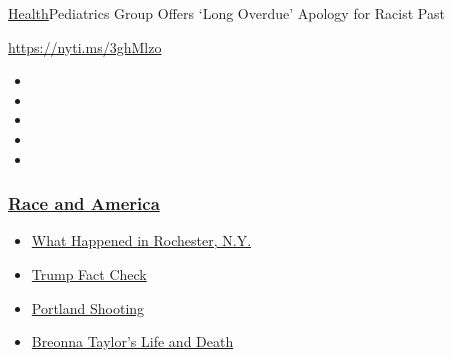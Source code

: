 \href{/section/health}{Health}\textbar{}Pediatrics Group Offers `Long
Overdue' Apology for Racist Past

\url{https://nyti.ms/3ghMlzo}

\begin{itemize}
\item
\item
\item
\item
\item
\end{itemize}

\hypertarget{race-and-america}{%
\subsubsection{\texorpdfstring{\href{https://www.nytimes3xbfgragh.onion/news-event/george-floyd-protests-minneapolis-new-york-los-angeles?name=styln-george-floyd\&region=TOP_BANNER\&block=storyline_menu_recirc\&action=click\&pgtype=Article\&impression_id=c7436050-f292-11ea-b36f-5d9f0c0b3376\&variant=undefined}{Race
and America}}{Race and America}}\label{race-and-america}}

\begin{itemize}
\tightlist
\item
  \href{https://www.nytimes3xbfgragh.onion/2020/09/04/nyregion/rochester-police-daniel-prude.html?name=styln-george-floyd\&region=TOP_BANNER\&block=storyline_menu_recirc\&action=click\&pgtype=Article\&impression_id=c7436051-f292-11ea-b36f-5d9f0c0b3376\&variant=undefined}{What
  Happened in Rochester, N.Y.}
\item
  \href{https://www.nytimes3xbfgragh.onion/2020/09/01/us/politics/trump-fact-check-protests.html?name=styln-george-floyd\&region=TOP_BANNER\&block=storyline_menu_recirc\&action=click\&pgtype=Article\&impression_id=c7436052-f292-11ea-b36f-5d9f0c0b3376\&variant=undefined}{Trump
  Fact Check}
\item
  \href{https://www.nytimes3xbfgragh.onion/2020/08/30/us/portland-shooting-explained.html?name=styln-george-floyd\&region=TOP_BANNER\&block=storyline_menu_recirc\&action=click\&pgtype=Article\&impression_id=c7436053-f292-11ea-b36f-5d9f0c0b3376\&variant=undefined}{Portland
  Shooting}
\item
  \href{https://www.nytimes3xbfgragh.onion/2020/08/30/us/breonna-taylor-police-killing.html?name=styln-george-floyd\&region=TOP_BANNER\&block=storyline_menu_recirc\&action=click\&pgtype=Article\&impression_id=c7436054-f292-11ea-b36f-5d9f0c0b3376\&variant=undefined}{Breonna
  Taylor's Life and Death}
\end{itemize}

